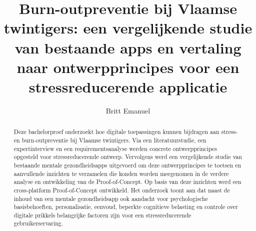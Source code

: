 \documentclass[a0,portrait]{hogent-poster}
\title{Burn-outpreventie bij Vlaamse twintigers: een vergelijkende studie van bestaande apps en vertaling naar ontwerpprincipes voor een stressreducerende applicatie}
\subtitle{}
\author{Britt Emanuel}
\begin{document}
\maketitle

\begin{abstract}
Deze bachelorproef onderzoekt hoe digitale toepassingen kunnen bijdragen aan stress- en burn-outpreventie bij Vlaamse twintigers. Via een literatuurstudie, een expertinterview en een requirementsanalyse werden concrete ontwerpprincipes opgesteld voor stressreducerende ontwerp. Vervolgens werd een vergelijkende studie van bestaande mentale gezondheidsapps uitgevoerd om deze ontwerpprincipes te toetsen en aanvullende inzichten te verzamelen die konden worden meegenomen in de verdere analyse en ontwikkeling van de Proof-of-Concept. Op basis van deze inzichten werd een cross-platform Proof-of-Concept ontwikkeld. Het onderzoek toont aan dat naast de inhoud van een mentale gezondheidsapp ook aandacht voor psychologische basisbehoeften, personalisatie, eenvoud, beperkte cognitieve belasting en controle over digitale prikkels belangrijke factoren zijn voor een stressreducerende gebruikerservaring.
\end{abstract}
\end{document}
